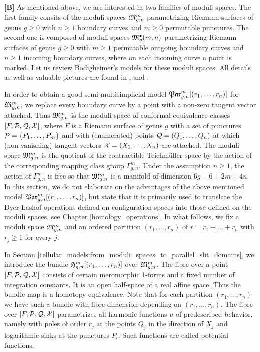 {\bf [B]} As mentioned above, we are interested in two families of moduli spaces.
The first family consits of the moduli spaces $\mathfrak{M}^m_{g,n}$ parametrizing
Riemann surfaces of genus $g \ge 0$ with $n \ge 1$ boundary curves and $m \ge 0$ permutable punctures.
The second one is composed of moduli spaces $\mathfrak{M}^\bullet_g(m, n)$ parametrizing Riemann surfaces of genus $g \ge 0$ with $m \ge 1$ permutable outgoing boundary curves and
$n \ge 1$ incoming boundary curves, where on each incoming curve a point is marked.
Let us review Bödigheimer's models for these moduli spaces.
All details as well as valuable pictures are found in \cite{Boedigheimer19901}, \cite{Boedigheimer19902} and \cite{Boedigheimer2006}.

In order to obtain a good semi-multisimplicial model $\Parr$ for $\mathfrak{M}^m_{g,n}$, we replace every boundary curve by a point with a non-zero tangent vector attached.
Thus $\mathfrak{M}^m_{g,n}$ is the moduli space of conformal equivalence classes $[F, \mathcal{P}, \mathcal{Q}, \mathcal{X}]$, where
$F$ is a Riemann surface of genus $g$ with a set of punctures $\mc P = \{ P_1, \ldots, P_m \}$ and with (enumerated) points $\mc Q = ( Q_1, \ldots, Q_n )$ at which (non-vanishing) tangent vectors $\mc X = ( X_1, \ldots, X_n )$ are attached.
The moduli space $\mathfrak{M}^m_{g,n}$ is the quotient of the contractible Teichmüller space by the action of the corresponding mapping class group $\Gamma_{g,n}^m$.
Under the assumption $n \ge 1$, the action of $\Gamma_{g,n}^m$ is free so that $\mathfrak{M}^m_{g,n}$ is a manifold of dimension $6g - 6 + 2m + 4n$.
In this section, we do not elaborate on the advantages of the above mentioned model $\Parr$,
but state that it is primarily used to translate the Dyer-Lashof operations defined on configuration spaces into those defined on the moduli spaces,
see Chapter \ref{homology_operations}.
In what follows, we fix a moduli space $\mathfrak{M}^m_{g,n}$ and an ordered partition $(r_1, \ldots, r_n)$ of $r = r_1 + \ldots + r_n$ with $r_j \ge 1$ for every $j$.

In Section \ref{cellular_models:from_moduli_spaces_to_parallel_slit_domains}, we introduce the bundle $\Harmr$ over $\mathfrak{M}^m_{g,n}$.
The fibre over a point $[F, \mathcal{P}, \mathcal{Q}, \mathcal{X}]$ consists of certain meromorphic 1-forms and a fixed number of integration constants.
It is an open half-space of a real affine space.
Thus the bundle map is a homotopy equivalence. Note that for each partition $(r_1, \ldots, r_n)$ we have such a bundle with fibre dimension depending on $(r_1, \ldots, r_n)$.
The fibre over $[F, \mathcal{P}, \mathcal{Q}, \mathcal{X}]$ parametrizes all harmonic functions $u$ of predescribed behavior, namely with poles of order $r_j$ at
the points $Q_j$ in the direction of $X_j$ and logarithmic sinks at the punctures $P_i$.
Such functions are called potential functions.

